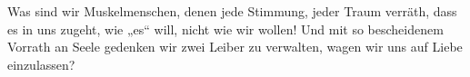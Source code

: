 Was sind wir Muskelmenschen, denen jede Stimmung, jeder Traum verräth, dass es in uns zugeht, wie „es“ will, nicht wie wir wollen! Und mit so bescheidenem Vorrath an Seele gedenken wir zwei Leiber zu verwalten, wagen wir uns auf Liebe einzulassen?
\par


